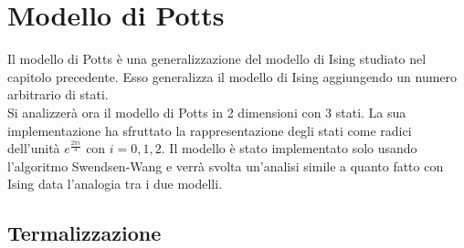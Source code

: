 \newpage
\chapter{Modello di Potts}
Il modello di Potts è una generalizzazione del modello di Ising studiato nel capitolo precedente.
Esso generalizza il modello di Ising aggiungendo un numero arbitrario di stati.\\
 Si analizzerà ora il modello di Potts in 2 dimensioni con 3 stati. La sua implementazione ha sfruttato la rappresentazione degli stati come radici dell'unità $e^{\frac{2 \pi i}{3} }$ con $i=0,1,2$.
Il modello è stato implementato solo usando l'algoritmo Swendsen-Wang e verrà svolta un'analisi simile a quanto fatto con Ising data l'analogia tra i due modelli.


\section{Termalizzazione}

